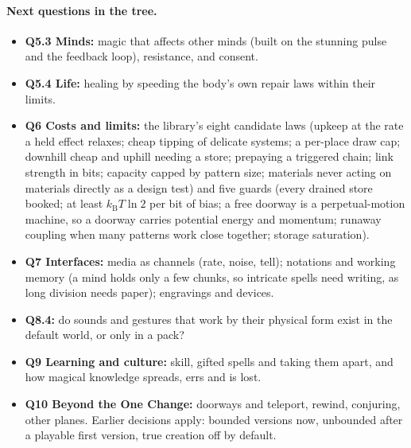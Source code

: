 \documentclass[11pt,a4paper]{article}
\newcommand{\kB}{k_{\mathrm B}}
\begin{document}
\paragraph{Next questions in the tree.}
\begin{itemize}
  \item \textbf{Q5.3 Minds:} magic that affects other minds (built on the stunning pulse and the feedback loop), resistance, and consent.
  \item \textbf{Q5.4 Life:} healing by speeding the body's own repair laws within their limits.
  \item \textbf{Q6 Costs and limits:} the library's eight candidate laws (upkeep at the rate a held effect relaxes; cheap tipping of delicate systems; a per-place draw cap; downhill cheap and uphill needing a store; prepaying a triggered chain; link strength in bits; capacity capped by pattern size; materials never acting on materials directly as a design test) and five guards (every drained store booked; at least $\kB T\ln 2$ per bit of bias; a free doorway is a perpetual-motion machine, so a doorway carries potential energy and momentum; runaway coupling when many patterns work close together; storage saturation).
  \item \textbf{Q7 Interfaces:} media as channels (rate, noise, tell); notations and working memory (a mind holds only a few chunks, so intricate spells need writing, as long division needs paper); engravings and devices.
  \item \textbf{Q8.4:} do sounds and gestures that work by their physical form exist in the default world, or only in a pack?
  \item \textbf{Q9 Learning and culture:} skill, gifted spells and taking them apart, and how magical knowledge spreads, errs and is lost.
  \item \textbf{Q10 Beyond the One Change:} doorways and teleport, rewind, conjuring, other planes. Earlier decisions apply: bounded versions now, unbounded after a playable first version, true creation off by default.
\end{itemize}
\end{document}
